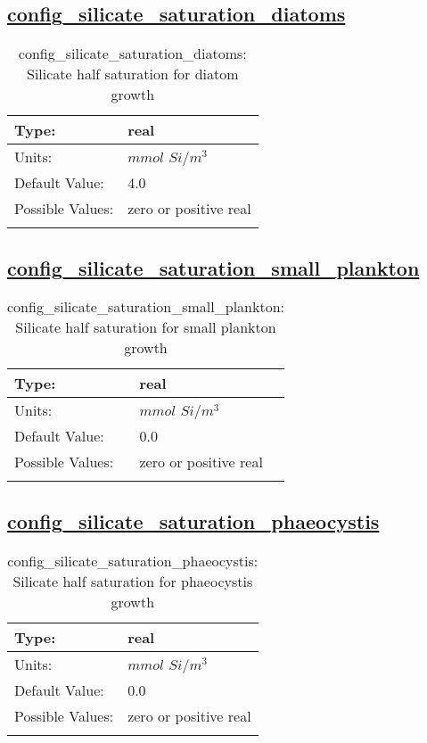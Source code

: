 \subsection[config\_silicate\_saturation\_diatoms]{\hyperref[sec:nm_tab_biogeochemistry]{config\_silicate\_saturation\_diatoms}}
\label{subsec:nm_sec_config_silicate_saturation_diatoms}
\begin{center}
\begin{longtable}{| p{2.0in} || p{4.0in} |}
    \hline
    Type: & real \\
    \hline
    Units: & $mmol$ $Si/m^3$ \\
    \hline
    Default Value: & 4.0 \\
    \hline
    Possible Values: & zero or positive real \\
    \hline
    \caption{config\_silicate\_saturation\_diatoms: Silicate half saturation for diatom growth}
\end{longtable}
\end{center}
\subsection[config\_silicate\_saturation\_small\_plankton]{\hyperref[sec:nm_tab_biogeochemistry]{config\_silicate\_saturation\_small\_plankton}}
\label{subsec:nm_sec_config_silicate_saturation_small_plankton}
\begin{center}
\begin{longtable}{| p{2.0in} || p{4.0in} |}
    \hline
    Type: & real \\
    \hline
    Units: & $mmol$ $Si/m^3$ \\
    \hline
    Default Value: & 0.0 \\
    \hline
    Possible Values: & zero or positive real \\
    \hline
    \caption{config\_silicate\_saturation\_small\_plankton: Silicate half saturation for small plankton growth}
\end{longtable}
\end{center}
\subsection[config\_silicate\_saturation\_phaeocystis]{\hyperref[sec:nm_tab_biogeochemistry]{config\_silicate\_saturation\_phaeocystis}}
\label{subsec:nm_sec_config_silicate_saturation_phaeocystis}
\begin{center}
\begin{longtable}{| p{2.0in} || p{4.0in} |}
    \hline
    Type: & real \\
    \hline
    Units: & $mmol$ $Si/m^3$ \\
    \hline
    Default Value: & 0.0 \\
    \hline
    Possible Values: & zero or positive real \\
    \hline
    \caption{config\_silicate\_saturation\_phaeocystis: Silicate half saturation for phaeocystis growth}
\end{longtable}
\end{center}
